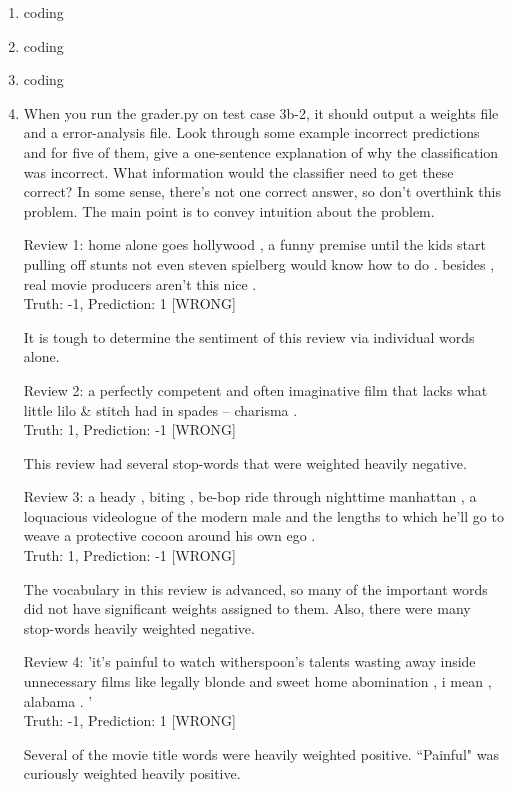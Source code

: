\documentclass[10pt]{article}
\begin{document}
\begin{enumerate}[label=(\alph*)]

  \item coding
  \item coding
  \item coding
  
  \item When you run the grader.py on test case 3b-2, it should output a weights file and a error-analysis file. Look through some example incorrect predictions and for five of them, give a one-sentence explanation of why the classification was incorrect. What information would the classifier need to get these correct? In some sense, there's not one correct answer, so don't overthink this problem. The main point is to convey intuition about the problem.

	Review 1: home alone goes hollywood , a funny premise until the kids start pulling off stunts not even steven spielberg would know how to do . besides , real movie producers aren't this nice .\\
Truth: -1, Prediction: 1 [WRONG]

	It is tough to determine the sentiment of this review via individual words alone.

	Review 2: a perfectly competent and often imaginative film that lacks what little lilo \& stitch had in spades -- charisma .\\
Truth: 1, Prediction: -1 [WRONG]

	This review had several stop-words that were weighted heavily negative.

	Review 3: a heady , biting , be-bop ride through nighttime manhattan , a loquacious videologue of the modern male and the lengths to which he'll go to weave a protective cocoon around his own ego .\\
Truth: 1, Prediction: -1 [WRONG]

	The vocabulary in this review is advanced, so many of the important words did not have significant weights assigned to them. Also, there were many stop-words heavily weighted negative.

	Review 4: 'it's painful to watch witherspoon's talents wasting away inside unnecessary films like legally blonde and sweet home abomination , i mean , alabama . '\\
Truth: -1, Prediction: 1 [WRONG]

	Several of the movie title words were heavily weighted positive. ``Painful" was curiously weighted heavily positive.


\end{enumerate}
\end{document}
